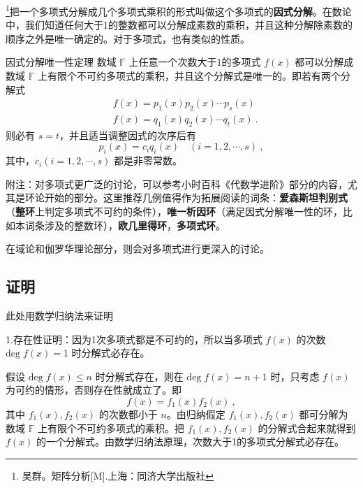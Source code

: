 
\footnote{吴群。矩阵分析[M].上海：同济大学出版社}把一个多项式分解成几个多项式乘积的形式叫做这个多项式的\textbf{因式分解}。在数论中，我们知道任何大于1的整数都可以分解成素数的乘积，并且这种分解除素数的顺序之外是唯一确定的。对于多项式，也有类似的性质。
\begin{theorem}{因式分解唯一性定理}
数域 $\mathbb{F}$ 上任意一个次数大于1的多项式 $f(x)$ 都可以分解成数域 $\mathbb{F}$ 上有限个不可约多项式的乘积，并且这个分解式是唯一的。即若有两个分解式
 \begin{equation}
 \begin{aligned}
 &f(x)=p_1(x)p_2(x)\cdots p_s(x)\\
 &f(x)=q_1(x)q_2(x)\cdots q_t(x)~.
 \end{aligned}
 \end{equation}
 则必有 $s=t$，并且适当调整因式的次序后有
 \begin{equation}
 p_i(x)=c_iq_i(x)\quad (i=1,2,\cdots,s)~,
 \end{equation}
 其中，$c_i(i=1,2,\cdots,s)$ 都是非零常数。
\end{theorem}


附注：对多项式更广泛的讨论，可以参考小时百科《代数学进阶》部分的内容，尤其是环论开始的部分。这里推荐几例值得作为拓展阅读的词条：\textbf{爱森斯坦判别式}（\textbf{整环}上判定多项式不可约的条件），\textbf{唯一析因环}（满足因式分解唯一性的环，比如本词条涉及的整数环），\textbf{欧几里得环}，\textbf{多项式环}。

在域论和伽罗华理论部分，则会对多项式进行更深入的讨论。


\subsection{证明}此处用数学归纳法来证明

1.存在性证明：因为1次多项式都是不可约的，所以当多项式 $f(x)$ 的次数 $\mathrm{deg}\;f(x)=1$ 时分解式必存在。

假设 $\mathrm{deg}\;f(x)\leq n$ 时分解式存在，则在 $\mathrm{deg}\;f(x)=n+1$ 时，只考虑 $f(x)$ 为可约的情形，否则存在性就成立了。即
\begin{equation}
f(x)=f_1(x)f_2(x)~,
\end{equation}
其中 $f_1(x),f_2(x)$ 的次数都小于 $n$。由归纳假定 $f_1(x),f_2(x)$ 都可分解为数域 $\mathbb{F}$ 上有限个不可约多项式的乘积。把 $f_1(x),f_2(x)$ 的分解式合起来就得到 $f(x)$ 的一个分解式。由数学归纳法原理，次数大于1的多项式分解式必存在。

